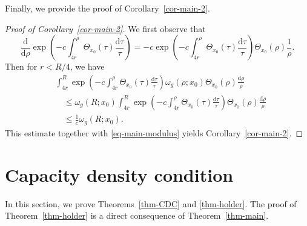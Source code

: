 \documentclass[11pt]{amsart}
\theoremstyle{plain}
\theoremstyle{definition}
\numberwithin{equation}{section}
\begin{document}
Finally, we provide the proof of Corollary~\ref{cor-main-2}.

\begin{proof}[Proof of Corollary~\ref{cor-main-2}]
We first observe that
\begin{equation*}
    \frac{\mathrm{d}}{\mathrm{d}\rho}\exp\left(-c \int_{4r}^{\rho} \Theta_{x_0}(\tau)\frac{\mathrm{d} \tau}{\tau}\right)=-c\exp\left(-c \int_{4r}^{\rho} \Theta_{x_0}(\tau)\frac{\mathrm{d} \tau}{\tau}\right) \Theta_{x_0}(\rho)\frac{1}{\rho}.
\end{equation*}
Then for $r<R/4$, we have
\begin{equation*}
    \begin{aligned}
        &\int_{4r}^R\exp\left(-c \int_{4r}^{\rho} \Theta_{x_0}(\tau)\frac{\mathrm{d} \tau}{\tau}\right) \omega_g(\rho; x_0)\Theta_{x_0}(\rho)\frac{\mathrm{d}\rho}{\rho}\\
        &\quad\leq \omega_g(R; x_0) \int_{4r}^{R}\exp\left(-c \int_{4r}^{\rho} \Theta_{x_0}(\tau)\frac{\mathrm{d} \tau}{\tau}\right) \Theta_{x_0}(\rho)\frac{\mathrm{d}\rho}{\rho}\\
        &\quad\leq \frac{1}{c}\omega_g(R; x_0).
    \end{aligned}
\end{equation*}
This estimate together with \eqref{eq-main-modulus} yields Corollary~\ref{cor-main-2}.
\end{proof}


\section{Capacity density condition}
\label{sec:CDC}

In this section, we prove Theorems~\ref{thm-CDC} and \ref{thm-holder}. The proof of Theorem~\ref{thm-holder} is a direct consequence of Theorem~\ref{thm-main}.
\end{document}
